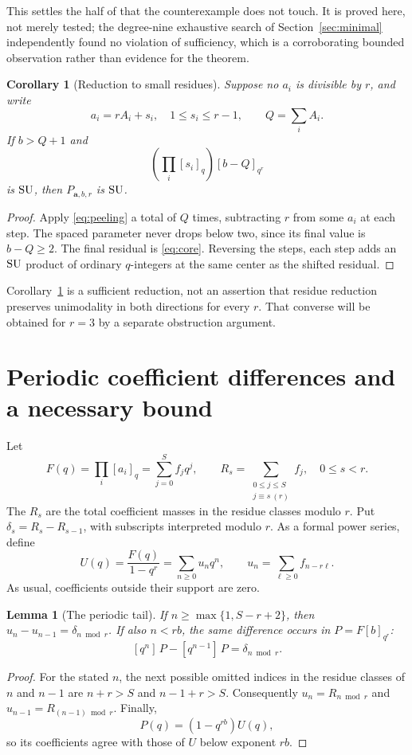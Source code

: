 \documentclass[11pt]{article}
\theoremstyle{research}
\newtheorem{lemma}[theorem]{Lemma}
\newtheorem{corollary}[theorem]{Corollary}
\theoremstyle{definition}
\newcommand{\qi}[1]{[#1]_q}
\newcommand{\qir}[2]{[#1]_{q^{#2}}}
\newcommand{\coef}[2]{[q^{#1}]\,#2}
\newcommand{\SU}{\textup{SU}}
\numberwithin{equation}{section}
\begin{document}
This settles the half of \cite[Conjecture 5.4]{CIMSY} that the
counterexample does not touch. It is proved here, not merely tested; the
degree-nine exhaustive search of Section~\ref{sec:minimal} independently
found no violation of sufficiency, which is a corroborating bounded
observation rather than evidence for the theorem.

\begin{corollary}[Reduction to small residues]\label{cor:core}
Suppose no $a_i$ is divisible by $r$, and write
\[
 a_i=rA_i+s_i,\quad 1\le s_i\le r-1,\qquad Q=\sum_i A_i.
\]
If $b>Q+1$ and
\begin{equation}\label{eq:core}
 \left(\prod_i\qi{s_i}\right)\qir{b-Q}{r}
\end{equation}
is $\SU$, then $P_{\boldsymbol a,b,r}$ is $\SU$.
\end{corollary}
\begin{proof}
Apply \eqref{eq:peeling} a total of $Q$ times, subtracting $r$ from
some $a_i$ at each step. The spaced parameter never drops below two,
since its final value is $b-Q\ge2$. The final residual is
\eqref{eq:core}. Reversing the steps, each step adds an $\SU$ product of
ordinary $q$-integers at the same center as the shifted residual.
\end{proof}

Corollary~\ref{cor:core} is a sufficient reduction, not an assertion that
residue reduction preserves unimodality in both directions for every $r$.
That converse will be obtained for $r=3$ by a separate obstruction argument.

\section{Periodic coefficient differences and a necessary bound}
\label{sec:residues}
Let
\[
 F(q)=\prod_i\qi{a_i}=\sum_{j=0}^S f_jq^j,
 \qquad R_s=\sum_{\substack{0\le j\le S\\j\equiv s\ (r)}}f_j,
 \quad 0\le s<r.
\]
The $R_s$ are the total coefficient masses in the residue classes modulo
$r$. Put $\delta_s=R_s-R_{s-1}$, with subscripts interpreted modulo $r$.
As a formal power series, define
\begin{equation}\label{eq:u-general}
 U(q)=\frac{F(q)}{1-q^r}=\sum_{n\ge0}u_nq^n,
 \qquad u_n=\sum_{\ell\ge0}f_{n-r\ell}.
\end{equation}
As usual, coefficients outside their support are zero.

\begin{lemma}[The periodic tail]\label{lem:tail}
If $n\ge\max\{1,S-r+2\}$, then
$u_n-u_{n-1}=\delta_{n\bmod r}$.
If also $n<rb$, the same difference occurs in
$P=F\qir b r$:
\begin{equation}\label{eq:taildiff}
 \coef nP-\coef{n-1}P=\delta_{n\bmod r}.
\end{equation}
\end{lemma}
\begin{proof}
For the stated $n$, the next possible omitted indices in the residue
classes of $n$ and $n-1$ are $n+r>S$ and $n-1+r>S$.
Consequently $u_n=R_{n\bmod r}$ and $u_{n-1}=R_{(n-1)\bmod r}$.
Finally,
\[
 P(q)=(1-q^{rb})U(q),
\]
so its coefficients agree with those of $U$ below exponent $rb$.
\end{proof}
\end{document}
